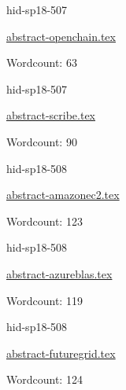 

\begin{IU}

hid-sp18-507

\href{https://github.com/cloudmesh-community/hid-sp18-507/blob/master//technology/abstract-openchain.tex}{abstract-openchain.tex}

 

Wordcount: 63

\end{IU}



\begin{IU}

hid-sp18-507

\href{https://github.com/cloudmesh-community/hid-sp18-507/blob/master//technology/abstract-scribe.tex}{abstract-scribe.tex}

 

Wordcount: 90

\end{IU}



\begin{IU}

hid-sp18-508

\href{https://github.com/cloudmesh-community/hid-sp18-508/blob/master//technology/abstract-amazonec2.tex}{abstract-amazonec2.tex}

 

Wordcount: 123

\end{IU}



\begin{IU}

hid-sp18-508

\href{https://github.com/cloudmesh-community/hid-sp18-508/blob/master//technology/abstract-azureblas.tex}{abstract-azureblas.tex}

 

Wordcount: 119

\end{IU}



\begin{IU}

hid-sp18-508

\href{https://github.com/cloudmesh-community/hid-sp18-508/blob/master//technology/abstract-futuregrid.tex}{abstract-futuregrid.tex}

 

Wordcount: 124

\end{IU}

